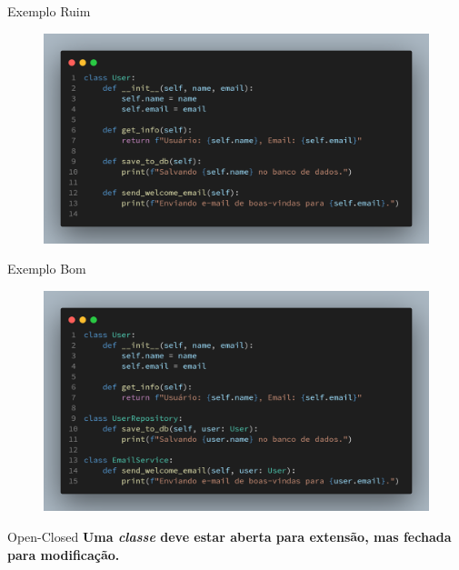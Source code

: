 \documentclass{libs/ufc_format}
\begin{document}
\begin{frame}{Exemplo \textcolor{gred}{Ruim}}
    \begin{figure}
        \centering
        \includegraphics[scale=0.17]{images/s_exemple_bad.png}
    \end{figure}
\end{frame}

\begin{frame}{Exemplo \textcolor{ggreen}{Bom}}
    \begin{figure}
        \centering
        \includegraphics[scale=0.17]{images/s_example_good.png}
    \end{figure}
\end{frame}

\begin{frame}{Open-Closed}
    \centering
    \textbf{Uma \emph{classe} deve estar aberta para extensão, mas fechada para
    modificação.}
\end{frame}
\end{document}

